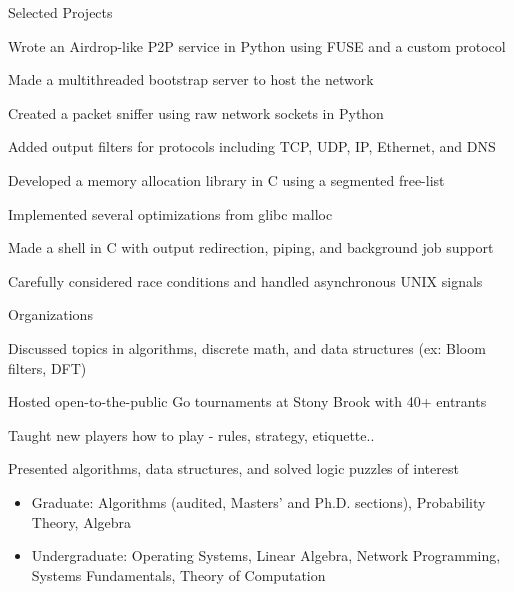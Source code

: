 \documentclass{cv}
\begin{document}
\begin{cvsection}{Selected Projects}
  {
    \item Wrote an Airdrop-like P2P service in Python using FUSE and a custom protocol
    \item Made a multithreaded bootstrap server to host the network
  }
  {
    \item Created a packet sniffer using raw network sockets in Python
    \item Added output filters for protocols including TCP, UDP, IP, Ethernet, and DNS
  }
  {
    \item Developed a memory allocation library in C using a segmented free-list
    \item Implemented several optimizations from glibc malloc
  }
  {
    \item Made a shell in C with output redirection, piping, and background job support
    \item Carefully considered race conditions and handled asynchronous UNIX signals
  }
\end{cvsection}

\begin{cvsection}{Organizations}
  {
    \item Discussed topics in algorithms, discrete math, and data structures (ex: Bloom filters, DFT)
  }
  {
    \item Hosted open-to-the-public Go tournaments at Stony Brook with 40+ entrants
    \item Taught new players how to play - rules, strategy, etiquette..
  }
  {
    \item Presented algorithms, data structures, and solved logic puzzles of interest
  }
\end{cvsection}

\begin{minipage}{\textwidth}
  \begin{itemize}[noitemsep,topsep=0pt]%
    \item Graduate: Algorithms (audited, Masters' and Ph.D. sections), Probability Theory, Algebra
    \item Undergraduate: Operating Systems, Linear Algebra, Network Programming, Systems Fundamentals, Theory of Computation
  \end{itemize}%
\end{minipage}%
\end{document}
